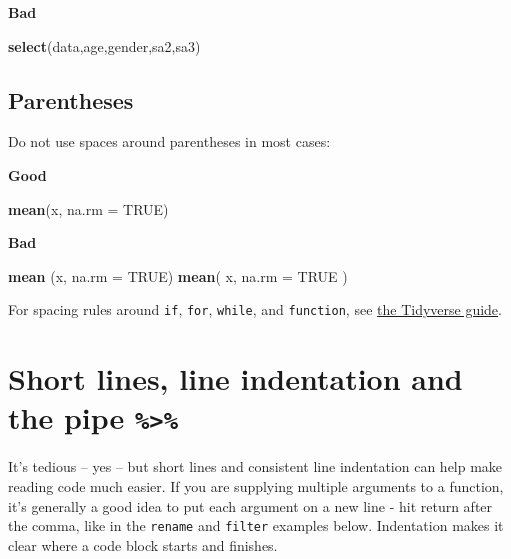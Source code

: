 \documentclass[]{book}
\newenvironment{Shaded}{\begin{snugshade}}{\end{snugshade}}
\newcommand{\DataTypeTok}[1]{\textcolor[rgb]{0.13,0.29,0.53}{#1}}
\newcommand{\KeywordTok}[1]{\textcolor[rgb]{0.13,0.29,0.53}{\textbf{#1}}}
\newcommand{\NormalTok}[1]{#1}
\newcommand{\OtherTok}[1]{\textcolor[rgb]{0.56,0.35,0.01}{#1}}
\begin{document}
\textbf{Bad}

\begin{Shaded}
\begin{Highlighting}[]
\KeywordTok{select}\NormalTok{(data,age,gender,sa2,sa3)}
\end{Highlighting}
\end{Shaded}

\hypertarget{parentheses}{%
\subsection{Parentheses}\label{parentheses}}

Do not use spaces around parentheses in most cases:

\textbf{Good}

\begin{Shaded}
\begin{Highlighting}[]
\KeywordTok{mean}\NormalTok{(x, }\DataTypeTok{na.rm =} \OtherTok{TRUE}\NormalTok{)}
\end{Highlighting}
\end{Shaded}

\textbf{Bad}

\begin{Shaded}
\begin{Highlighting}[]
\KeywordTok{mean}\NormalTok{ (x, }\DataTypeTok{na.rm =} \OtherTok{TRUE}\NormalTok{)}
\KeywordTok{mean}\NormalTok{( x, }\DataTypeTok{na.rm =} \OtherTok{TRUE}\NormalTok{ )}
\end{Highlighting}
\end{Shaded}

For spacing rules around \texttt{if}, \texttt{for}, \texttt{while}, and \texttt{function}, see \href{https://style.tidyverse.org/syntax.html\#parentheses}{the Tidyverse guide}.

\hypertarget{short-lines-line-indentation-and-the-pipe}{%
\section{\texorpdfstring{Short lines, line indentation and the pipe \texttt{\%\textgreater{}\%}}{Short lines, line indentation and the pipe \%\textgreater{}\%}}\label{short-lines-line-indentation-and-the-pipe}}

It's tedious -- yes -- but short lines and consistent line indentation can help make reading code much easier. If you are supplying multiple arguments to a function, it's generally a good idea to put each argument on a new line - hit return after the comma, like in the \texttt{rename} and \texttt{filter} examples below. Indentation makes it clear where a code block starts and finishes.
\end{document}
